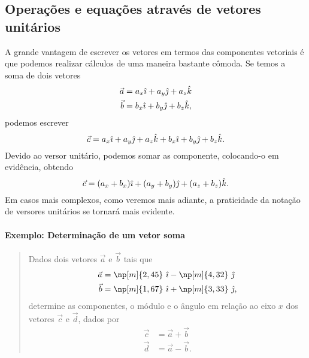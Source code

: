 \subsection{Operações e equações através de vetores unitários}

A grande vantagem de escrever os vetores em termos das componentes vetoriais é que podemos realizar cálculos de uma maneira bastante cômoda. Se temos a soma de dois vetores 
\begin{align}
  \vec{a} &= a_x \hat{\imath} + a_y \hat{\jmath} + a_z \hat{k} \\
  \vec{b} &= b_x \hat{\imath} + b_y \hat{\jmath} + b_z \hat{k},
\end{align}
%
podemos escrever
\begin{equation}
  \vec{c} = a_x \hat{\imath} + a_y \hat{\jmath} + a_z \hat{k} + b_x \hat{\imath} + b_y \hat{\jmath} + b_z \hat{k}.
\end{equation}
%
Devido ao versor unitário, podemos somar as componente, colocando-o em evidência, obtendo
\begin{equation}
  \vec{c} = (a_x + b_x) \hat{\imath} + (a_y + b_y) \hat{\jmath} + (a_z + b_z)\hat{k}.
\end{equation}
%
Em casos mais complexos, como veremos mais adiante, a praticidade da notação de versores unitários se tornará mais evidente.

\paragraph{Exemplo: Determinação de um vetor soma}

\begin{quote}
    Dados dois vetores $\vec{a}$ e $\vec{b}$ tais que
        \begin{align}
            \vec{a} &= \np[m]{2,45}~\versi - \np[m]{4,32}~\versj \\
            \vec{b} &= \np[m]{1,67}~\versi + \np[m]{3,33}~\versj,
        \end{align}
    determine as componentes, o módulo e o ângulo em relação ao eixo $x$ dos vetores $\vec{c}$ e $\vec{d}$, dados por
        \begin{align}
            \vec{c} &= \vec{a} + \vec{b} \\
            \vec{d} &= \vec{a} - \vec{b}.
        \end{align}
\end{quote}

